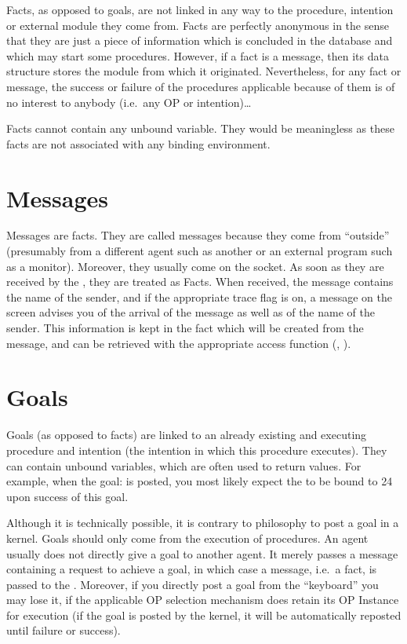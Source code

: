 Facts, as opposed to goals, are not linked in any way to the procedure,
intention or external module they come from. Facts are perfectly anonymous in
the sense that they are just a piece of information which is concluded in the
database and which may start some procedures. However, if a fact is a message,
then its data structure stores the module from which it originated.
Nevertheless, for any fact or message, the success or failure of the procedures
applicable because of them is of no interest to anybody (i.e.\ any
OP or intention)\dots{}

Facts cannot contain any unbound variable. They would be meaningless as
these facts are not associated with any binding environment.

\section{Messages}

Messages are facts. They are called messages because they come from ``outside''
(presumably from a different agent such as another \CPK{} or an external
program such as a monitor). Moreover, they usually come on the \MPA{} socket. As
soon as they are received by the \CPK{}, they are treated as Facts. When
received, the message contains the name of the sender, and if the appropriate
trace flag is on, a message on the screen advises you of the arrival of the
message as well as of the name of the sender. This information is kept in the
fact which will be created from the message, and can be retrieved with the
appropriate access function (, ).

\section{Goals}

Goals (as opposed to facts) are linked to an already existing and executing
procedure and intention (the intention in which this procedure executes).  They
can contain unbound variables, which are often used to return values.  For
example, when the goal:  is posted, you most likely
expect the  to be bound to 24 upon success of this goal.

Although it is technically possible, it is contrary to \OPRS{} philosophy to
post a goal in a kernel. Goals should only come from the execution of
procedures. An agent usually does not directly give a goal to another agent. It
merely passes a message containing a request to achieve a goal, in which case a
message, i.e.\ a fact, is passed to the \CPK{}.  Moreover, if you directly post
a goal from the ``keyboard'' you may lose it, if the applicable OP selection
mechanism does retain its OP Instance for execution (if the goal is posted by
the kernel, it will be automatically reposted until failure or success).

